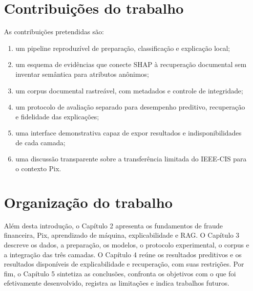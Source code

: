 \section{Contribuições do trabalho}

As contribuições pretendidas são:

\begin{enumerate}
  \item um pipeline reproduzível de preparação, classificação e explicação local;
  \item um esquema de evidências que conecte SHAP à recuperação documental sem inventar semântica para atributos anônimos;
  \item um corpus documental rastreável, com metadados e controle de integridade;
  \item um protocolo de avaliação separado para desempenho preditivo, recuperação e fidelidade das explicações;
  \item uma interface demonstrativa capaz de expor resultados e indisponibilidades de cada camada;
  \item uma discussão transparente sobre a transferência limitada do IEEE-CIS para o contexto Pix.
\end{enumerate}

\section{Organização do trabalho}

Além desta introdução, o Capítulo 2 apresenta os fundamentos de fraude financeira, Pix, aprendizado de máquina, explicabilidade e RAG. O Capítulo 3 descreve os dados, a preparação, os modelos, o protocolo experimental, o corpus e a integração das três camadas. O Capítulo 4 reúne os resultados preditivos e os resultados disponíveis de explicabilidade e recuperação, com suas restrições. Por fim, o Capítulo 5 sintetiza as conclusões, confronta os objetivos com o que foi efetivamente desenvolvido, registra as limitações e indica trabalhos futuros.
